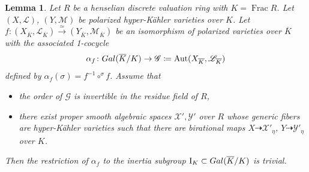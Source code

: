 \documentclass[10pt,a4paper]{amsart}
\newtheorem{lemma}{Lemma}
\DeclareMathOperator{\Aut}{Aut}
\DeclareMathOperator{\Frac}{Frac}
\newcommand{\Gal}{{\rm Gal}}
\begin{document}
\begin{lemma}
\label{Lemma:Unramifiedness}
Let $R$ be a henselian discrete valuation ring with $K = \Frac R$.
Let $(X, \mathscr{L})$, $(Y,\mathscr{M})$ be polarized hyper-Kähler varieties over $K$. Let
$f \colon (X_{\overline{K}}, \mathscr{L}_{\overline{K}})
\overset{\simeq}{\to}
(Y_{\overline{K}}, \mathscr{M}_{\overline{K}})$
be an isomorphism of polarized varieties over $\overline{K}$
with the associated 1-cocycle
\[ \alpha_{f} \colon \Gal(\overline{K}/K) \to \mathscr{G} \coloneqq \Aut(X_{\overline{K}}, \mathscr{L}_{\overline{K}}) \]
defined by %
$\alpha_{f} (\sigma) = f^{-1} \circ ^{\sigma} \!f$.
Assume that
\begin{itemize}
\item the order of $\mathscr{G}$ is invertible in the residue field of $R$,
\item there exist proper smooth algebraic spaces
$\mathcal{X}', \mathcal{Y}'$ over $R$
whose generic fibers are hyper-Kähler varieties
such that there are birational maps
$X \dasharrow \mathcal{X}'_{\eta}$,
$Y \dasharrow \mathcal{Y}'_{\eta}$ over $K$.
\end{itemize}
Then the restriction of $\alpha_{f}$ to the inertia subgroup
$\mathrm{I}_K \subset \Gal(\overline{K}/K)$
is trivial.
\end{lemma}
\end{document}
